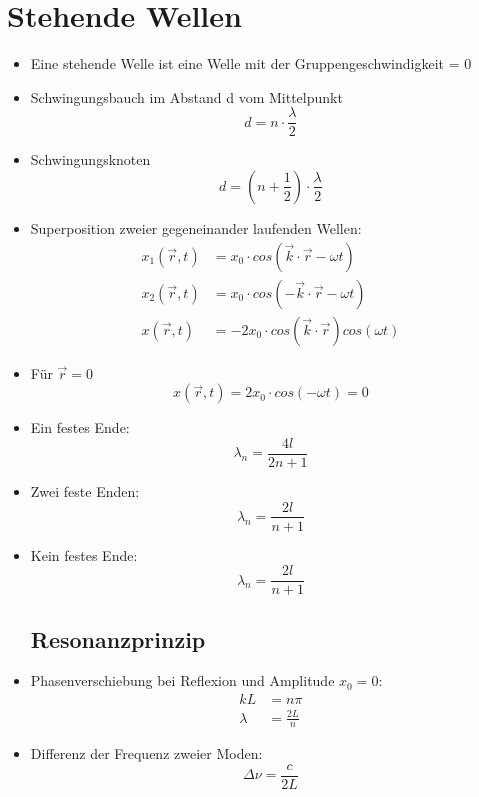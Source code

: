 \documentclass[10pt,a4paper]{article}
\begin{document}
\section{Stehende Wellen}
\begin{itemize}
\item Eine stehende Welle ist eine Welle mit der Gruppengeschwindigkeit = 0
\item Schwingungsbauch im Abstand d vom Mittelpunkt
\begin{equation}
d=n \cdot \frac{\lambda}{2}
\end{equation}
\item Schwingungsknoten
\begin{equation}
d=(n+\frac{1}{2}) \cdot \frac{\lambda}{2}
\end{equation}
\item Superposition zweier gegeneinander laufenden Wellen:
\begin{align}
x_1(\vec r,t) &=x_0 \cdot cos(\vec k \cdot \vec r -\omega t) \\
x_2(\vec r,t) &=x_0 \cdot cos(-\vec k \cdot \vec r -\omega t) \\
x(\vec r,t) &=-2 x_0 \cdot cos(\vec k \cdot \vec r) cos(\omega t)
\end{align}
\item Für $\vec r = 0$
\begin{equation}
x(\vec r,t)=2x_0 \cdot cos(-\omega  t)=0
\end{equation}
\item Ein festes Ende:
\begin{equation}
\lambda_n = \frac{4l}{2n+1}
\end{equation}
\item Zwei feste Enden:
\begin{equation}
\lambda_n = \frac{2l}{n+1}
\end{equation}
\item Kein festes Ende:
\begin{equation}
\lambda_n =\frac{2l}{n+1}
\end{equation}
\subsection{Resonanzprinzip}
\item Phasenverschiebung bei Reflexion und Amplitude $x_0=0$:
\begin{align}
k L &=n \pi \\
\lambda &=\frac{2L}{n}
\end{align}
\item Differenz der Frequenz zweier Moden:
\begin{equation}
\Delta \nu = \frac{c}{2L}
\end{equation}
\end{itemize}
\end{document}
